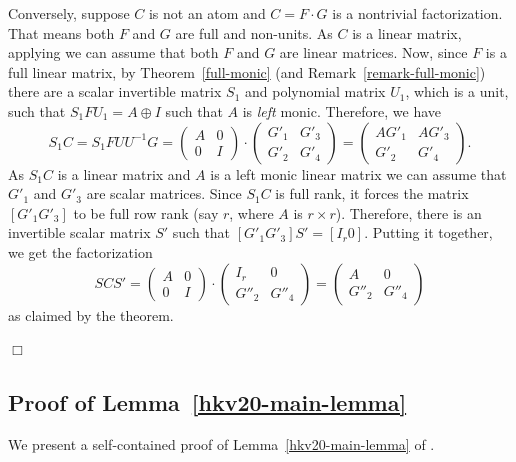 \documentclass[10pt,a4paper]{article}
\newenvironment{proofof}[1]{\noindent{\it Proof of #1. }} {{\qed}}
\def\qed{\hspace*{\fill} $\Box$\par\medskip}
\begin{document}
\begin{proofof}{Theorem~\ref{cohnthm}}
Conversely, suppose $C$ is not an atom and $C=F\cdot G$ is a
nontrivial factorization. That means both $F$ and $G$ are full and
non-units. As $C$ is a linear matrix, applying \cite[Lemma
  5.8.7]{Cohnfir} we can assume that both $F$ and $G$ are linear
matrices. Now, since $F$ is a full linear matrix, by
Theorem~\ref{full-monic} (and Remark~\ref{remark-full-monic}) there
are a scalar invertible matrix $S_1$ and polynomial matrix $U_1$,
which is a unit, such that $S_1FU_1 = A\oplus I$ such that $A$ is
\emph{left} monic. Therefore, we have
\[
S_1 C = S_1 F U U^{-1} G = \left(
\begin{array}{cc}
A & 0 \\
0 & I
\end{array}
\right) \cdot \left(
\begin{array}{cc}
G'_1 & G'_3 \\
G'_2 & G'_4
\end{array}
\right) = \left(
\begin{array}{cc}
AG'_1 & AG'_3 \\
G'_2 & G'_4
\end{array}
\right).
\]
As $S_1 C$ is a linear matrix and $A$ is a left monic linear matrix we
can assume that $G'_1$ and $G'_3$ are scalar matrices. Since $S_1 C$ is
full rank, it forces the matrix $[G'_1 G'_3]$ to be full row rank (say
$r$, where $A$ is $r\times r$). Therefore, there is an invertible
scalar matrix $S'$ such that $[G'_1 G'_3]S' = [I_r 0]$. Putting it together,
we get the factorization
\[
SCS' = \left(
\begin{array}{cc}
A & 0 \\
0 & I
\end{array}
\right) \cdot
\left(
\begin{array}{cc}
I_r & 0 \\
G''_2 & G''_4
\end{array}
\right) =  \left(
\begin{array}{cc}
A & 0 \\
G''_2 & G''_4
\end{array}
\right)
\]
as claimed by the theorem.
\end{proofof}



\subsection{Proof of Lemma~\ref{hkv20-main-lemma}}


We present a self-contained proof of Lemma~\ref{hkv20-main-lemma} of
\cite{HKV20}.
\end{document}
